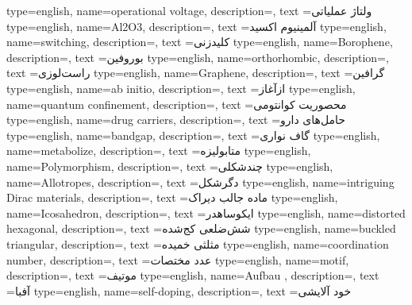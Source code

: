 {
    type=english,
    name={operational voltage},
    description={},
    text ={ولتاژ عملیاتی}
}
{
    type=english,
    name={Al2O3},
    description={},
    text ={آلمینیوم اکسید}
}
{
    type=english,
    name={switching},
    description={},
    text ={کلیدزنی}
}
{
    type=english,
    name={Borophene},
    description={},
    text ={بوروفین}
}
{
    type=english,
    name={orthorhombic},
    description={},
    text ={راست‌لوزی}
}
{
    type=english,
    name={Graphene},
    description={},
    text ={گرافین}
}
{
    type=english,
    name={ab initio},
    description={},
    text ={از‌آغاز}
}
{
    type=english,
    name={quantum confinement},
    description={},
    text ={محصوریت کوانتومی}
}
{
    type=english,
    name={drug carriers},
    description={},
    text ={حامل‌های دارو}
}
{
    type=english,
    name={bandgap},
    description={},
    text ={گاف نواری}
}
{
    type=english,
    name={metabolize},
    description={},
    text ={متابولیزه}
}
{
    type=english,
    name={Polymorphism},
    description={},
    text ={چندشکلی}
}
{
    type=english,
    name={Allotropes},
    description={},
    text ={دگرشکل‌}
}
{
    type=english,
    name={intriguing Dirac materials},
    description={},
    text ={ماده‌ جالب‌ دیراک}
}
{
    type=english,
    name={Icosahedron},
    description={},
    text ={ایکوساهدر}
}
{
    type=english,
    name={distorted hexagonal},
    description={},
    text ={شش‌ضلعی کج‌شده}
}
{
    type=english,
    name={buckled triangular},
    description={},
    text ={مثلثی خمیده}
}
{
    type=english,
    name={coordination number},
    description={},
    text ={عدد مختصات}
}
{
    type=english,
    name={motif},
    description={},
    text ={موتیف}
}
{
    type=english,
    name={Aufbau },
    description={},
    text ={آفبا}
}
{
    type=english,
    name={self-doping},
    description={},
    text ={خود آلایشی}
}
